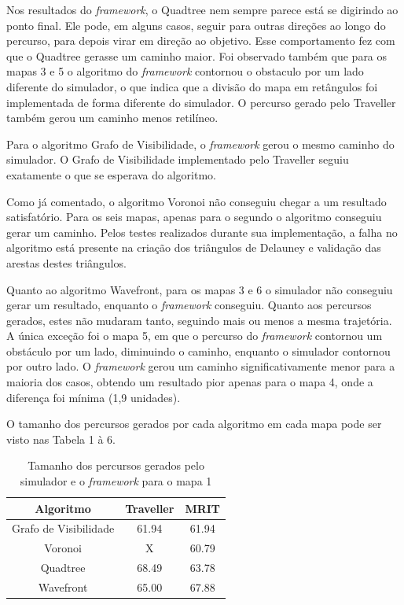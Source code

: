 Nos resultados do \textit{framework}, o Quadtree nem sempre parece está se digirindo ao ponto final. Ele pode, em alguns casos, seguir para outras direções ao longo do percurso, para depois virar em direção ao objetivo. Esse comportamento fez com que o Quadtree gerasse um caminho maior. Foi observado também que para os mapas 3 e 5 o algoritmo do \textit{framework} contornou o obstaculo por um lado diferente do simulador, o que indica que a divisão do mapa em retângulos foi implementada de forma diferente do simulador. O percurso gerado pelo Traveller também gerou um caminho menos retilíneo.

Para o algoritmo Grafo de Visibilidade, o \textit{framework} gerou o mesmo caminho do simulador. O Grafo de Visibilidade implementado pelo Traveller seguiu exatamente o que se esperava do algoritmo.

Como já comentado, o algoritmo Voronoi não conseguiu chegar a um resultado satisfatório. Para os seis mapas, apenas para o segundo o algoritmo conseguiu gerar um caminho. Pelos testes realizados durante sua implementação, a falha no algoritmo está presente na criação dos triângulos de Delauney e validação das arestas destes triângulos.

Quanto ao algoritmo Wavefront, para os mapas 3 e 6 o simulador não conseguiu gerar um resultado, enquanto o \textit{framework} conseguiu. Quanto aos percursos gerados,
estes não mudaram tanto, seguindo mais ou menos a mesma trajetória. A única exceção foi o mapa 5, em que o percurso do \textit{framework} contornou um obstáculo por um lado, diminuindo o caminho, enquanto o simulador contornou por outro lado. O \textit{framework} gerou um caminho significativamente menor para a maioria dos casos, obtendo um resultado pior apenas para o mapa 4, onde a diferença foi mínima (1,9 unidades).

O tamanho dos percursos gerados por cada algoritmo em cada mapa pode ser visto nas Tabela 1 à 6.

\begin{table}[h]
	\centering
	\label{tab01}
	\caption{Tamanho dos percursos gerados pelo simulador e o \textit{framework} para o mapa 1}
	\begin{tabular}{ccc}
		\toprule
		\textbf{Algoritmo} & \textbf{Traveller} & \textbf{MRIT} \\
		\midrule
Grafo de Visibilidade & 61.94   & 61.94 \\
Voronoi 				  & X       & 60.79 \\
Quadtree				  & 68.49   & 63.78 \\
Wavefront             & 65.00    & 67.88  \\
		\bottomrule
	\end{tabular}
\end{table}

